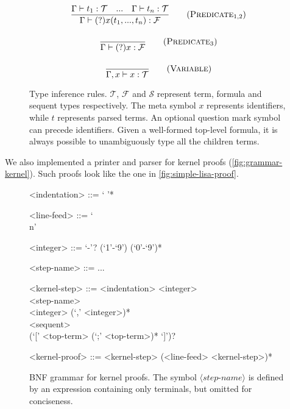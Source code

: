 \begin{figure}[H]
\begin{framed}
\begin{gather}
  \frac{\Gamma \vdash t_1: \mathcal{T} \quad ... \quad \Gamma \vdash t_n: \mathcal{T}}{\Gamma \vdash (?)x(t_1, ..., t_n): \mathcal{F}}
  \tag{$\textsc{Predicate}_{1,2}$} \\[1em]
  \frac{}{\Gamma \vdash (?)x: \mathcal{F}} \tag{$\textsc{Predicate}_3$} \\[1em]
  \frac{}{\Gamma, x \vdash x: \mathcal{T}} \tag{\textsc{Variable}}
  \end{gather}
  \end{framed}
  \caption[Type inference rules]{Type inference rules. $\mathcal{T}$, $\mathcal{F}$ and $\mathcal{S}$ represent term, formula and sequent types respectively. The meta symbol $x$ represents identifiers, while $t$ represents parsed terms. An optional question mark symbol can precede identifiers. Given a well-formed top-level formula, it is always possible to unambiguously type all the children terms.}
  \label{fig:typing-rules}
\end{figure}

We also implemented a printer and parser for kernel proofs (\autoref{fig:grammar-kernel}). Such proofs look like the one in \autoref{fig:simple-lisa-proof}.

\begin{figure}[H]
  \centering
  \begin{framed}
  \begin{grammar}
  <indentation> ::= ` '*

  <line-feed> ::= `\\n'
  
  <integer> ::= `-'? (`1'-`9') (`0'-`9')*

  <step-name> ::= ...

  <kernel-step> ::= <indentation> <integer> \\ 
  <step-name> \\
  <integer> (`,' <integer>)* \\
  <sequent> \\
  (`[' <top-term> (`;' <top-term>)* `]')?

  <kernel-proof> ::= <kernel-step> (<line-feed> <kernel-step>)*
  \end{grammar}
  \end{framed}
  \caption[BNF grammar for kernel proofs]{BNF grammar for kernel proofs. The symbol $\langle\textit{step-name}\rangle$ is defined by an expression containing only terminals, but omitted for conciseness.}
  \label{fig:grammar-kernel}
\end{figure}

